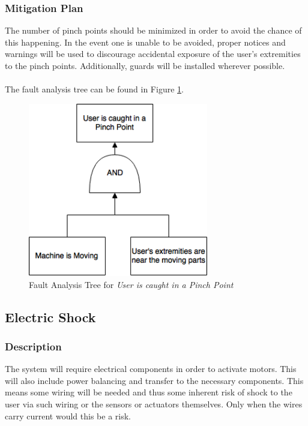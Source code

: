 \documentclass[11pt]{article}
\begin{document}
\subsubsection*{Mitigation Plan}
The number of pinch points should be minimized in order to avoid the chance of this happening. In the event one is unable to be avoided, proper notices and warnings will be used to discourage accidental exposure of the user's extremities to the pinch points. Additionally, guards will be installed wherever possible. \\ \\
The fault analysis tree can be found in Figure \ref{fig:ft-pinch}.

\begin{figure}[H]
   \centering
   \includegraphics[width=0.7\textwidth]{img/ft-pinch.png} %
   \caption{Fault Analysis Tree for \textit{User is caught in a Pinch Point}}
   \label{fig:ft-pinch}
\end{figure}

\subsection{Electric Shock}
\subsubsection*{Description}
The system will require electrical components in order to activate motors. This will also include power balancing and transfer to the necessary components. This means some wiring will be needed and thus some inherent risk of shock to the user via such wiring or the sensors or actuators themselves. Only when the wires carry current would this be a risk.
\end{document}

